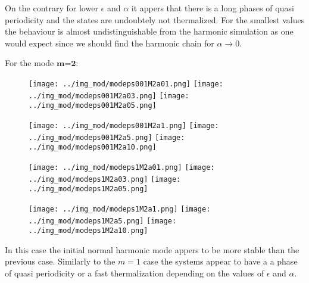 \documentclass[10pt]{article}
\numberwithin{equation}{section}
\begin{document}
On the contrary for lower $\epsilon$ and $\alpha$ it appers that there is a long phases of quasi periodicity and the states are undoubtely not thermalized. For the smallest values the behaviour is almost undistinguishable from the harmonic simulation as one would expect since we should find the harmonic chain for $\alpha \rightarrow 0$.


For the mode $\textbf{m=2}$:
\begin{figure}[!htb]
    \texttt{[image: ../img\_mod/modeps001M2a01.png]}
\endminipage \hfill
{}
    \texttt{[image: ../img\_mod/modeps001M2a03.png]}
\endminipage \hfill
{}
    \texttt{[image: ../img\_mod/modeps001M2a05.png]}
\endminipage 
\end{figure}

\begin{figure}[!htb]
    \texttt{[image: ../img\_mod/modeps001M2a1.png]}
\endminipage \hfill
{}
    \texttt{[image: ../img\_mod/modeps001M2a5.png]}
\endminipage \hfill
{}
    \texttt{[image: ../img\_mod/modeps001M2a10.png]}
\endminipage 
\end{figure}

\begin{figure}[!htb]
    \texttt{[image: ../img\_mod/modeps1M2a01.png]}
\endminipage \hfill
{}
    \texttt{[image: ../img\_mod/modeps1M2a03.png]}
\endminipage \hfill
{}
    \texttt{[image: ../img\_mod/modeps1M2a05.png]}
\endminipage 
\end{figure}

\clearpage

\begin{figure}[!htb]
    \texttt{[image: ../img\_mod/modeps1M2a1.png]}
\endminipage \hfill
{}
    \texttt{[image: ../img\_mod/modeps1M2a5.png]}
\endminipage \hfill
{}
    \texttt{[image: ../img\_mod/modeps1M2a10.png]}
\endminipage 
\end{figure}

In this case the initial normal harmonic mode appers to be more stable than the previous case. Similarly to the $m=1$ case the systems appear to have a  a phase of quasi periodicity or a fast thermalization depending on the values of $\epsilon$ and $\alpha$.
\end{document}
